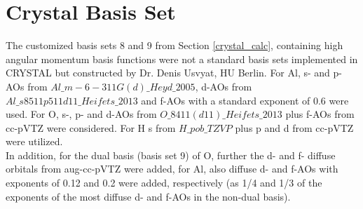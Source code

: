 \documentclass[11pt,DIV=13,BCOR=5mm,a4paper,headinclude]{scrbook}
\begin{document}
\section{Crystal Basis Set}\label{app_combined_basis}
The customized basis sets 8 and 9 from Section \ref{crystal_calc}, containing high angular momentum basis functions were not a standard basis sets implemented in CRYSTAL but constructed by Dr. Denis Usvyat, HU Berlin.
For Al, s- and p-AOs from $Al\_m-6-311G(d)\_Heyd\_2005$, d-AOs from $Al\_s8511p511d11\_Heifets\_2013$ and f-AOs with a standard exponent of 0.6 were used.
For O, s-, p- and d-AOs from $O\_8411(d11)\_Heifets\_2013$ plus f-AOs from cc-pVTZ were considered.
For H s from $H\_pob\_TZVP$ plus p and d from cc-pVTZ were utilized.\\
In addition, for the dual basis (basis set 9) of O, further the d- and f- diffuse orbitals from aug-cc-pVTZ were added, for Al, also diffuse d- and f-AOs with exponents of 0.12 and 0.2 were added, respectively (as 1/4 and 1/3 of the exponents of the most diffuse d- and f-AOs in the non-dual basis).
\end{document}
